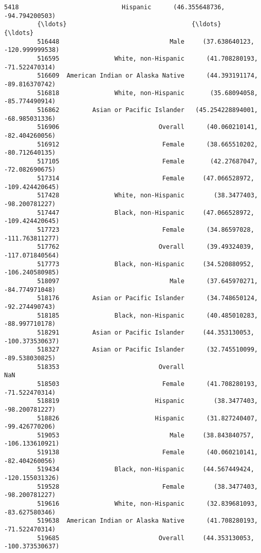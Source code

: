 \documentclass[11pt]{article}
\begin{document}
\begin{Verbatim}[commandchars=\\\{\}]
         5418                            Hispanic      (46.355648736, -94.794200503)   
         {\ldots}                                  {\ldots}                                {\ldots}   
         516448                              Male     (37.638640123, -120.999999538)   
         516595               White, non-Hispanic      (41.708280193, -71.522470314)   
         516609  American Indian or Alaska Native      (44.393191174, -89.816370742)   
         516818               White, non-Hispanic       (35.68094058, -85.774490914)   
         516862         Asian or Pacific Islander   (45.254228894001, -68.985031336)   
         516906                           Overall      (40.060210141, -82.404260056)   
         516912                            Female      (38.665510202, -80.712640135)   
         517105                            Female       (42.27687047, -72.082690675)   
         517314                            Female     (47.066528972, -109.424420645)   
         517428               White, non-Hispanic        (38.3477403, -98.200781227)   
         517447               Black, non-Hispanic     (47.066528972, -109.424420645)   
         517723                            Female      (34.86597028, -111.763811277)   
         517762                           Overall      (39.49324039, -117.071840564)   
         517773               Black, non-Hispanic     (34.520880952, -106.240580985)   
         518097                              Male      (37.645970271, -84.774971048)   
         518176         Asian or Pacific Islander      (34.748650124, -92.274490743)   
         518185               Black, non-Hispanic      (40.485010283, -88.997710178)   
         518291         Asian or Pacific Islander     (44.353130053, -100.373530637)   
         518327         Asian or Pacific Islander      (32.745510099, -89.538030825)   
         518353                           Overall                                NaN   
         518503                            Female      (41.708280193, -71.522470314)   
         518819                          Hispanic        (38.3477403, -98.200781227)   
         518826                          Hispanic      (31.827240407, -99.426770206)   
         519053                              Male     (38.843840757, -106.133610921)   
         519138                            Female      (40.060210141, -82.404260056)   
         519434               Black, non-Hispanic     (44.567449424, -120.155031326)   
         519528                            Female        (38.3477403, -98.200781227)   
         519616               White, non-Hispanic      (32.839681093, -83.627580346)   
         519638  American Indian or Alaska Native      (41.708280193, -71.522470314)   
         519685                           Overall     (44.353130053, -100.373530637)   
         

\end{Verbatim}
\end{document}
